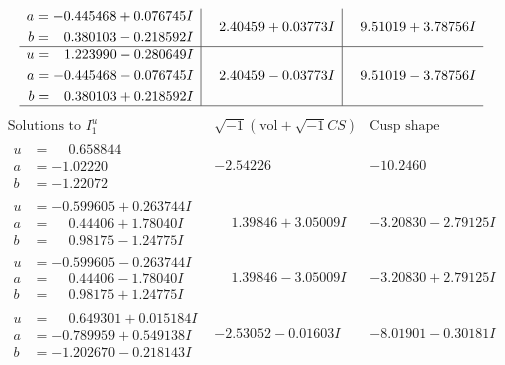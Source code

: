 \documentclass[1p]{elsarticle_modified}
\theoremstyle{definition}
\newcommand{\I}{\sqrt{-1}}
\begin{document}
$$\begin{array}{c|c|c}
\begin{aligned}
a &= -0.445468 + 0.076745 I \\
b &= \phantom{-}0.380103 - 0.218592 I\end{aligned}
 & \phantom{-}2.40459 + 0.03773 I & \phantom{-}9.51019 + 3.78756 I \\ \hline\begin{aligned}
u &= \phantom{-}1.223990 - 0.280649 I \\
a &= -0.445468 - 0.076745 I \\
b &= \phantom{-}0.380103 + 0.218592 I\end{aligned}
 & \phantom{-}2.40459 - 0.03773 I & \phantom{-}9.51019 - 3.78756 I\\
 \hline 
 \end{array}$$\newpage$$\begin{array}{c|c|c}  
\text{Solutions to }I^u_{1}& \I (\text{vol} + \sqrt{-1}CS) & \text{Cusp shape}\\
 \hline 
\begin{aligned}
u &= \phantom{-}0.658844\phantom{ +0.000000I} \\
a &= -1.02220\phantom{ +0.000000I} \\
b &= -1.22072\phantom{ +0.000000I}\end{aligned}
 & -2.54226\phantom{ +0.000000I} & -10.2460\phantom{ +0.000000I} \\ \hline\begin{aligned}
u &= -0.599605 + 0.263744 I \\
a &= \phantom{-}0.44406 + 1.78040 I \\
b &= \phantom{-}0.98175 - 1.24775 I\end{aligned}
 & \phantom{-}1.39846 + 3.05009 I & -3.20830 - 2.79125 I \\ \hline\begin{aligned}
u &= -0.599605 - 0.263744 I \\
a &= \phantom{-}0.44406 - 1.78040 I \\
b &= \phantom{-}0.98175 + 1.24775 I\end{aligned}
 & \phantom{-}1.39846 - 3.05009 I & -3.20830 + 2.79125 I \\ \hline\begin{aligned}
u &= \phantom{-}0.649301 + 0.015184 I \\
a &= -0.789959 + 0.549138 I \\
b &= -1.202670 - 0.218143 I\end{aligned}
 & -2.53052 - 0.01603 I & -8.01901 - 0.30181 I \\ \hline\begin{aligned}

\end{aligned}
\end{array}$$
\end{document}
